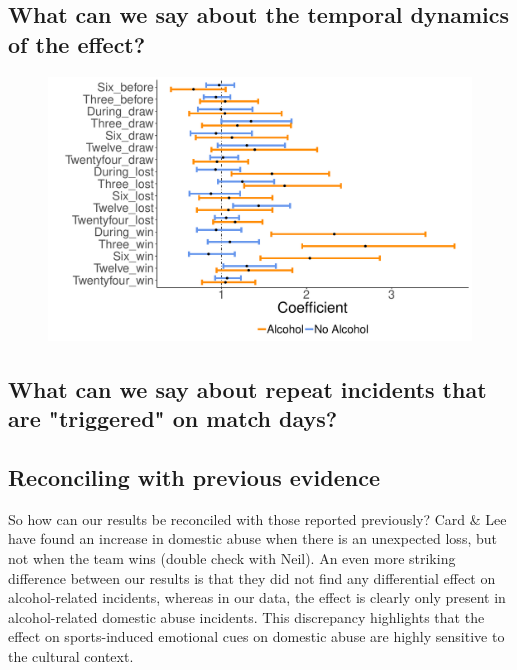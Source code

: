 \documentclass[12pt, letterpaper]{article}
\begin{document}
\subsection{What can we say about the temporal dynamics of the effect?}
\begin{figure}[htb!]
\centering
\includegraphics[width=1\textwidth]{Threehours.pdf}
\label{fig:DA_compare}
\end{figure}

\newpage

\subsection{What can we say about repeat incidents that are "triggered" on match days?}




\subsection{Reconciling with previous evidence}

So how can our results be reconciled with those reported previously? Card \& Lee have found an increase in domestic abuse when there is an unexpected loss, but not when the team wins (double check with Neil). An even more striking difference between our results is that they did not find any differential effect on alcohol-related incidents, whereas in our data, the effect is clearly only present in alcohol-related domestic abuse incidents. This discrepancy highlights that the effect on sports-induced emotional cues on domestic abuse are highly sensitive to the cultural context.
\end{document}
